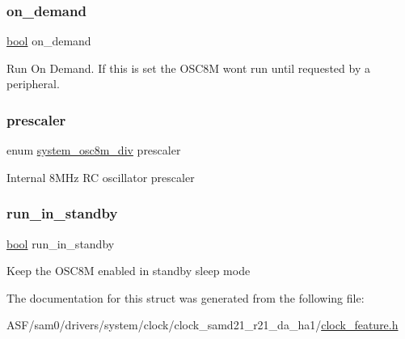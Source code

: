 \subsubsection{\texorpdfstring{on\_demand}{on\_demand}}
{\footnotesize\ttfamily \mbox{\hyperlink{group__group__sam0__utils_ga97a80ca1602ebf2303258971a2c938e2}{bool}} on\+\_\+demand}

Run On Demand. If this is set the O\+S\+C8M won\textquotesingle{}t run until requested by a peripheral. \mbox{\label{structsystem__clock__source__osc8m__config_ad53a17fe54bf225d744012928394e50b}} 
\subsubsection{\texorpdfstring{prescaler}{prescaler}}
{\footnotesize\ttfamily enum \mbox{\hyperlink{group__asfdoc__sam0__system__clock__group_ga1ee1b0be167bd253038400d9c6d0cbef}{system\+\_\+osc8m\+\_\+div}} prescaler}

Internal 8M\+Hz RC oscillator prescaler \mbox{\label{structsystem__clock__source__osc8m__config_a514964d5c2a8da4dd96bac82a53477f2}} 
\subsubsection{\texorpdfstring{run\_in\_standby}{run\_in\_standby}}
{\footnotesize\ttfamily \mbox{\hyperlink{group__group__sam0__utils_ga97a80ca1602ebf2303258971a2c938e2}{bool}} run\+\_\+in\+\_\+standby}

Keep the O\+S\+C8M enabled in standby sleep mode 

The documentation for this struct was generated from the following file\+:\begin{DoxyCompactItemize}
\item 
A\+S\+F/sam0/drivers/system/clock/clock\+\_\+samd21\+\_\+r21\+\_\+da\+\_\+ha1/\mbox{\hyperlink{clock__feature_8h}{clock\+\_\+feature.\+h}}\end{DoxyCompactItemize}

